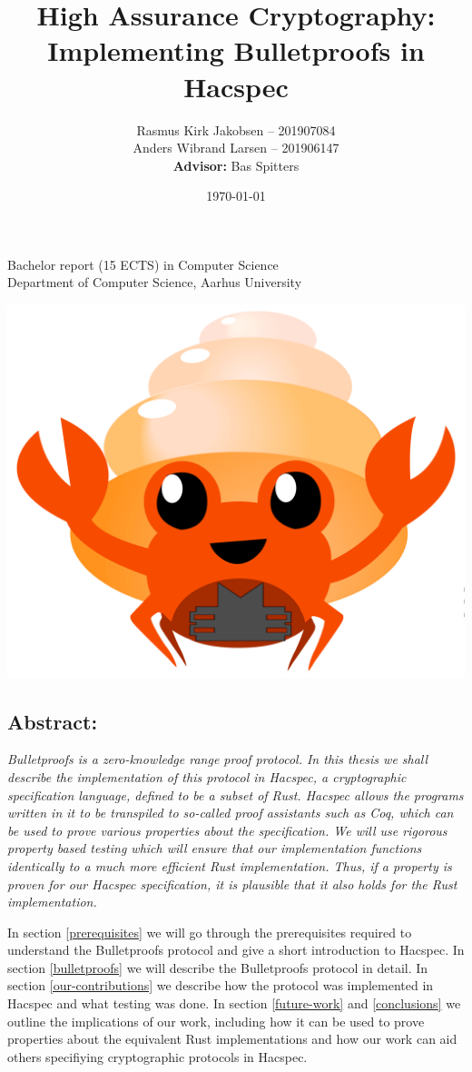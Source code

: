 \documentclass{article}
\title{High Assurance Cryptography: Implementing Bulletproofs in Hacspec}
\author{ 
Rasmus Kirk Jakobsen -- 201907084\\
Anders Wibrand Larsen -- 201906147\\
\textbf{Advisor:} Bas Spitters
}
\date{\today}
\begin{document}
\maketitle

\begin{center}
    Bachelor report (15 ECTS) in Computer Science\\
Department of Computer Science, Aarhus University\\
\end{center} 

\begin{center}
	\includegraphics[scale=0.4]{img/bulletproof-hacspec-2.png}
\end{center} 

\subsection*{Abstract:}

{\itshape
	Bulletproofs is a zero-knowledge range proof protocol. In this
	thesis we shall describe the implementation of this protocol
	in Hacspec, a cryptographic specification language, defined to
	be a subset of Rust. Hacspec allows the programs
	written in it to be transpiled to so-called proof assistants
	such as Coq, which can be used to prove various properties
	about the specification. We will use rigorous property based
	testing which will ensure that our implementation functions
	identically to a much more efficient Rust implementation. Thus,
	if a property is proven for our Hacspec specification, it is
	plausible that it also holds for the Rust implementation.

	In section \ref{prerequisites} we will go through the
	prerequisites required to understand the Bulletproofs
	protocol and give a short introduction to Hacspec. In section
	\ref{bulletproofs} we will describe the Bulletproofs protocol in
	detail. In section \ref{our-contributions} we describe how
	the protocol was implemented in Hacspec and what testing was
	done. In section \ref{future-work} and \ref{conclusions}
	we outline the implications of our work, including how it
	can be used to prove properties about the equivalent Rust
	implementations and how our work can aid others specifiying
	cryptographic protocols in Hacspec.
}
\end{document}
